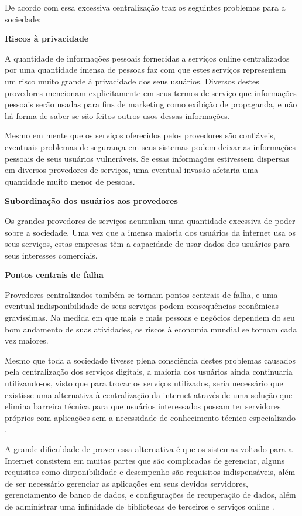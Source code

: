 De acordo com \cite{shak2015} essa excessiva centralização traz os seguintes
problemas para a sociedade:

\textbf{Riscos à privacidade}

A quantidade de informações pessoais fornecidas a serviços online
centralizados por uma quantidade imensa de pessoas faz com que estes serviços
representem um risco muito grande à privacidade dos seus usuários. Diversos
destes provedores mencionam explicitamente em seus termos de serviço que
informações pessoais serão usadas para fins de marketing como exibição de
propaganda, e não há forma de saber se são feitos outros usos dessas
informações.

Mesmo em mente que os serviços oferecidos pelos provedores são
confiáveis, eventuais problemas de segurança em seus sistemas podem deixar as
informações pessoais de seus usuários vulneráveis. Se essas informações estivessem dispersas em
diversos provedores de serviços, uma eventual invasão afetaria uma quantidade
muito menor de pessoas.

\textbf{Subordinação dos usuários aos provedores}

Os grandes provedores de serviços acumulam uma quantidade excessiva de poder
sobre a sociedade. Uma vez que a imensa maioria dos usuários da internet usa
os seus serviços, estas empresas têm a capacidade de usar dados dos usuários para
seus interesses comerciais.

\textbf{Pontos centrais de falha}

Provedores centralizados também se tornam pontos centrais de falha, e uma
eventual indisponibilidade de seus serviços podem consequências econômicas
gravíssimas. Na medida em que mais e mais pessoas e negócios dependem do seu
bom andamento de suas atividades, os riscos à economia mundial se tornam cada
vez maiores.

Mesmo que toda a sociedade tivesse plena consciência destes problemas causados
pela centralização dos serviços digitais, a maioria dos usuários ainda
continuaria utilizando-os, visto que para trocar os serviços utilizados, seria
necessário que existisse uma alternativa à centralização da internet através
de uma solução que elimina barreira técnica para que usuários interessados
possam ter servidores próprios com aplicações sem a necessidade de conhecimento
técnico especializado .

A grande dificuldade de prover essa alternativa é que os sistemas voltado para a
Internet consistem em muitas partes que são complicadas de gerenciar, alguns
requisitos como disponibilidade e desempenho são requisitos indispensáveis, além de ser
necessário gerenciar as aplicações em seus devidos servidores, gerenciamento de
banco de dados, e configurações de recuperação de dados, além de administrar uma
infinidade de bibliotecas de terceiros e serviços online \cite{6265084}.

